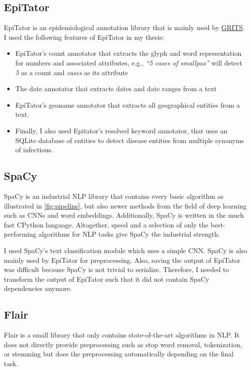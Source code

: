 \subsection{EpiTator}
  EpiTator is an epidemiological annotation library that is mainly used by \href{https://grits.eha.io}{GRITS}.
  I used the following features of EpiTator in my thesis:
  \begin{itemize}
    \item EpiTator's count annotator that extracts the glyph and word representation for numbers and associated attributes, e.g., \textit{``5 cases of smallpox''} will detect \textit{5} as a count and \textit{cases} as its attribute
    \item The date annotator that extracts dates and date ranges from a text
    \item EpiTator's geoname annotator that extracts all geographical entities from a text.
    \item Finally, I also used Epitator's resolved keyword annotator, that uses an SQLite database of entities to detect disease entities from multiple synonyms of infectious.
  \end{itemize}

\subsection{SpaCy}
  SpaCy is an industrial NLP library that contains every basic algorithm as illustrated in \ref{fig:pipeline}, but also newer methods from the field of deep learning such as CNNs and word embeddings.
  Additionally, SpaCy is written in the much fast CPython language.
  Altogether, speed and a selection of only the best-performing algorithms for NLP tasks give SpaCy the industrial strength.

  I used SpaCy's text classification module which uses a simple CNN.
  SpaCy is also mainly used by EpiTator for preprocessing.
  Also, saving the output of EpiTator was difficult because SpaCy is not trivial to serialize.
  Therefore, I needed to transform the output of EpiTator such that it did not contain SpaCy dependencies anymore.

\subsection{Flair}
  Flair is a small library that only contains state-of-the-art algorithms in NLP.
  It does not directly provide preprocessing such as stop word removal, tokenization, or stemming but does the preprocessing automatically depending on the final task.

